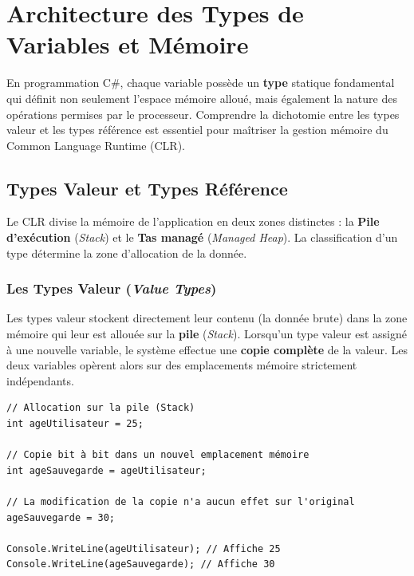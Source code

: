 
\newpage
\section{Architecture des Types de Variables et Mémoire}

En programmation C\#, chaque variable possède un \textbf{type} statique fondamental qui définit non seulement l'espace mémoire alloué, mais également la nature des opérations permises par le processeur. Comprendre la dichotomie entre les types valeur et les types référence est essentiel pour maîtriser la gestion mémoire du Common Language Runtime (CLR).

\subsection{Types Valeur et Types Référence}

Le CLR divise la mémoire de l'application en deux zones distinctes : la \textbf{Pile d'exécution} (\emph{Stack}) et le \textbf{Tas managé} (\emph{Managed Heap}). La classification d'un type détermine la zone d'allocation de la donnée.

\subsubsection{Les Types Valeur (\emph{Value Types})}
Les types valeur stockent directement leur contenu (la donnée brute) dans la zone mémoire qui leur est allouée sur la \textbf{pile} (\emph{Stack}).
Lorsqu'un type valeur est assigné à une nouvelle variable, le système effectue une \textbf{copie complète} de la valeur. Les deux variables opèrent alors sur des emplacements mémoire strictement indépendants.

\begin{lstlisting}[caption={Comportement en mémoire des types valeur (pile)}]
// Allocation sur la pile (Stack)
int ageUtilisateur = 25; 

// Copie bit à bit dans un nouvel emplacement mémoire
int ageSauvegarde = ageUtilisateur; 

// La modification de la copie n'a aucun effet sur l'original
ageSauvegarde = 30; 

Console.WriteLine(ageUtilisateur); // Affiche 25
Console.WriteLine(ageSauvegarde); // Affiche 30
\end{lstlisting}

